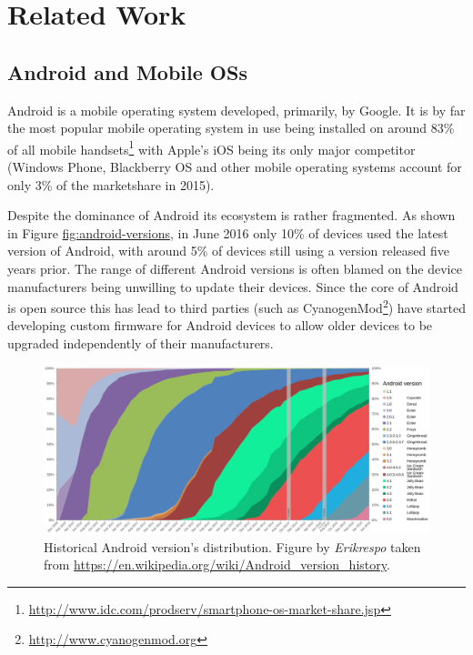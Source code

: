 \documentclass[thesis.tex]{subfiles}
\begin{document}
\chapter{Related Work}
\label{chap:related-work}

\section{Android and Mobile OSs}\label{android}

Android is a mobile operating system developed, primarily, by Google. It is by
far the most popular mobile operating system in use being installed on around
83\% of all mobile
handsets\footnote{\url{http://www.idc.com/prodserv/smartphone-os-market-share.jsp}}
with Apple's iOS being its only major competitor (Windows Phone, Blackberry OS
and other mobile operating systems account for only 3\% of the marketshare in
2015).

Despite the dominance of Android its ecosystem is rather fragmented. As shown in
Figure \url{fig:android-versions}, in June 2016 only 10\% of devices used the
latest version of Android, with around 5\% of devices still using a version
released five years prior. The range of different Android versions is often
blamed on the device manufacturers being unwilling to update their devices.
Since the core of Android is open source this has lead to third parties (such as
CyanogenMod\footnote{\url{http://www.cyanogenmod.org}}) have started developing
custom firmware for Android devices to allow older devices to be upgraded
independently of their manufacturers.

\begin{figure}[htbp]
\centering
\includegraphics[width=\linewidth]{figures/android-versions.pdf}
\caption[Historical Android version's distribution.]{Historical Android
  version's distribution. Figure by \emph{Erikrespo} taken from
  \url{https://en.wikipedia.org/wiki/Android_version_history}.}
\end{figure}
\end{document}
